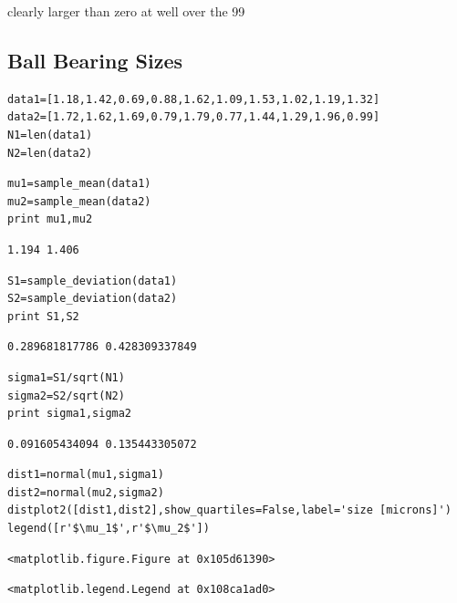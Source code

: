 clearly larger than zero at well over the 99%

\subsection{Ball Bearing Sizes}


\begin{lstlisting}
data1=[1.18,1.42,0.69,0.88,1.62,1.09,1.53,1.02,1.19,1.32]
data2=[1.72,1.62,1.69,0.79,1.79,0.77,1.44,1.29,1.96,0.99]
N1=len(data1)
N2=len(data2)
\end{lstlisting}

\begin{lstlisting}
mu1=sample_mean(data1)
mu2=sample_mean(data2)
print mu1,mu2
\end{lstlisting}

\begin{verbatim}
1.194 1.406
\end{verbatim}

\begin{lstlisting}
S1=sample_deviation(data1)
S2=sample_deviation(data2)
print S1,S2
\end{lstlisting}

\begin{verbatim}
0.289681817786 0.428309337849
\end{verbatim}

\begin{lstlisting}
sigma1=S1/sqrt(N1)
sigma2=S2/sqrt(N2)
print sigma1,sigma2
\end{lstlisting}

\begin{verbatim}
0.091605434094 0.135443305072
\end{verbatim}

\begin{lstlisting}
dist1=normal(mu1,sigma1)
dist2=normal(mu2,sigma2)
distplot2([dist1,dist2],show_quartiles=False,label='size [microns]')
legend([r'$\mu_1$',r'$\mu_2$'])
\end{lstlisting}

\begin{verbatim}
<matplotlib.figure.Figure at 0x105d61390>\end{verbatim}

\begin{verbatim}
<matplotlib.legend.Legend at 0x108ca1ad0>
\end{verbatim}

